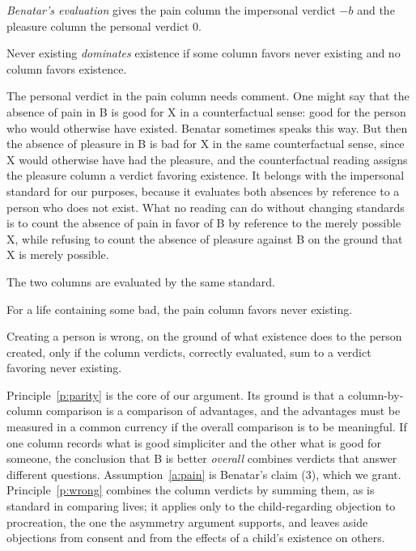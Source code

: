 \documentclass{situationist-preprint}
\begin{document}
\begin{definition}\label{d:benatar}
\emph{Benatar's evaluation} gives the pain column the impersonal verdict $-b$ and the pleasure column the personal verdict $0$.
\end{definition}

\begin{definition}[Dominance]\label{d:dominance}
Never existing \emph{dominates} existence if some column favors never existing and no column favors existence.
\end{definition}

The personal verdict in the pain column needs comment. One might say that the absence of pain in B is good for X in a counterfactual sense: good for the person who would otherwise have existed. Benatar sometimes speaks this way. But then the absence of pleasure in B is bad for X in the same counterfactual sense, since X would otherwise have had the pleasure, and the counterfactual reading assigns the pleasure column a verdict favoring existence. It belongs with the impersonal standard for our purposes, because it evaluates both absences by reference to a person who does not exist. What no reading can do without changing standards is to count the absence of pain in favor of B by reference to the merely possible X, while refusing to count the absence of pleasure against B on the ground that X is merely possible.

\begin{principle}[Parity]\label{p:parity}
The two columns are evaluated by the same standard.
\end{principle}

\begin{assumption}\label{a:pain}
For a life containing some bad, the pain column favors never existing.
\end{assumption}

\begin{principle}\label{p:wrong}
Creating a person is wrong, on the ground of what existence does to the person created, only if the column verdicts, correctly evaluated, sum to a verdict favoring never existing.
\end{principle}

Principle~\ref{p:parity} is the core of our argument. Its ground is that a column-by-column comparison is a comparison of advantages, and the advantages must be measured in a common currency if the overall comparison is to be meaningful. If one column records what is good simpliciter and the other what is good for someone, the conclusion that B is better \emph{overall} combines verdicts that answer different questions. Assumption~\ref{a:pain} is Benatar's claim (3), which we grant. Principle~\ref{p:wrong} combines the column verdicts by summing them, as is standard in comparing lives; it applies only to the child-regarding objection to procreation, the one the asymmetry argument supports, and leaves aside objections from consent and from the effects of a child's existence on others.
\end{document}

